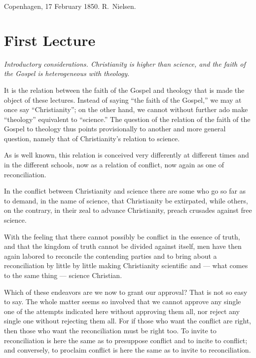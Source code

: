 \documentclass[12pt,a4paper]{book}
\begin{document}
\bigskip
\noindent Copenhagen, 17 February 1850.
\hfill R.\ Nielsen.

\chapter*{First Lecture}
\label{ch:forel1}

\begin{center}\itshape
Introductory considerations. Christianity is higher than science,
and the faith of the Gospel is heterogeneous with theology.
\end{center}

It is the relation between the faith of the Gospel and theology that is made
the object of these lectures. Instead of saying ``the faith of the Gospel,'' we
may at once say ``Christianity''; on the other hand, we cannot without further
ado make ``theology'' equivalent to ``science.'' The question of the relation
of the faith of the Gospel to theology thus points provisionally to another and
more general question, namely that of Christianity's relation to science.

As is well known, this relation is conceived very differently at different
times and in the different schools, now as a relation of conflict, now again as
one of reconciliation.

In the conflict between Christianity and science there are some who go so far
as to demand, in the name of science, that Christianity be extirpated, while
others, on the contrary, in their zeal to advance Christianity, preach crusades
against free science.

With the feeling that there cannot possibly be conflict in the essence of
truth, and that the kingdom of truth cannot be divided against itself, men have
then again labored to reconcile the contending
parties and to bring about a reconciliation by little by little making
Christianity scientific and --- what comes to the same thing --- science
Christian.

Which of these endeavors are we now to grant our approval? That is not so easy
to say. The whole matter seems so involved that we cannot approve any single
one of the attempts indicated here without approving them all, nor reject any
single one without rejecting them all. For if those who want the conflict are
right, then those who want the reconciliation must be right too. To invite to
reconciliation is here the same as to presuppose conflict and to incite to
conflict; and conversely, to proclaim conflict is here the same as to invite to
reconciliation.
\end{document}
